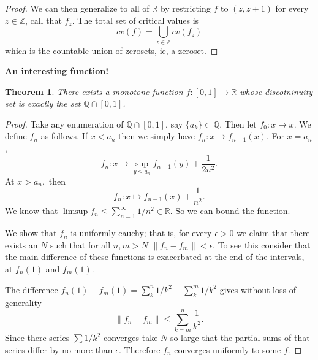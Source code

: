 \documentclass[letter]{article}
\newtheorem{theorem}{Theorem}
\newenvironment{menumerate}{%
  \edef\backupindent{\the\parindent}%
  \enumerate%
  \setlength{\parindent}{\backupindent}%
}{\endenumerate}
\begin{document}
\begin{menumerate}
\begin{proof}
		We can then generalize to all of $\mathbb{R}$ by restricting $f$ to $(z, z+1)$ for every $z \in \mathbb{Z}$, call that $f_z$. The total set of critical values is
		\begin{equation}
		cv(f) = \bigcup_{z \in \mathbb{Z}}cv(f_z)
		\end{equation}
		which is the countable union of zerosets, ie, a zeroset.
	\end{proof}
	\item \textbf{An interesting function!}
	\begin{theorem}
		There exists a monotone function $f:[0,1] \to \mathbb{R}$ whose discotninuity set is exactly the set $\mathbb{Q} \cap [0,1]$.
	\end{theorem}
	\begin{proof}
		Take any enumeration of $\mathbb{Q} \cap [0,1]$, say $\{a_k\} \subset \mathbb{Q}.$  Then let $f_0: x\mapsto x$. We define $f_n$ as follows.
		If $x < a_n$ then we simply have $f_n: x \mapsto f_{n-1}(x)$. 
		For $x = a_n$,
		\begin{equation}
		 	f_n: x \mapsto \sup_{y \leq a_n} f_{n-1}(y) + \frac{1}{2n^2}.
		 \end{equation} 
		 At $x > a_n,$ then
		 \begin{equation}
			f_n: x \mapsto f_{n-1}(x) + \frac{1}{n^2}.
		 \end{equation}
		 We know that $\limsup f_n \leq \sum_{n=1}^\infty 1/n^2 \in \mathbb{R}.$ So we can bound the function.

		  We show that $f_n$ is uniformly cauchy; that is, for every $\epsilon >0$ we claim that there exists an $N$ such that for all $n,m >  N$ $\|f_n - f_m\| < \epsilon.$
		 To see this consider that the main difference of these functions is
		 exacerbated at the end of the intervals, at $f_n(1)$ and $f_m(1).$

		 The difference $f_n(1) - f_m(1) = \sum_k^n 1/k^2 - \sum_k^m 1/k^2$ gives without loss of generality 
		 \begin{equation}
		 	\|f_n - f_m\| \leq \sum_{k=m}^n \frac{1}{k^2}.
		 \end{equation}
		 Since there series $\sum 1/k^2$ converges take $N$ so large that
		 the partial sums of that series differ by no more than $\epsilon$. Therefore $f_n $ converges uniformly to some $f.$


\end{proof}
\end{menumerate}
\end{document}
